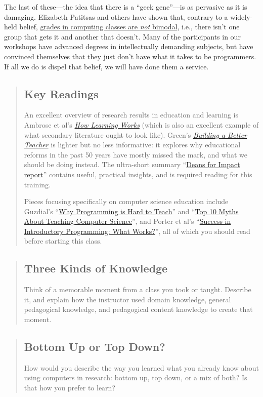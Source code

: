 The last of these---the idea that there is a ``geek gene''---is as pervasive as it is damaging.
Elizabeth Patitsas and others have shown that,
contrary to a widely-held belief,
\href{http://dl.acm.org/citation.cfm?id=2960312}{grades in computing classes are \emph{not} bimodal},
i.e.,
there isn't one group that gets it and another that doesn't.
Many of the participants in our workshops have advanced degrees in intellectually demanding subjects,
but have convinced themselves that they just don't have what it takes to be programmers.
If all we do is dispel that belief,
we will have done them a service.

\begin{quotation}   %
\subsection*{Key Readings}

An excellent overview of research results in education and learning is
Ambrose et al's \emph{\href{http://www.amazon.com/How-Learning-Works-Research-Based-Jossey-Bass/dp/0470484101/}{How Learning Works}}
(which is also an excellent example of what secondary literature ought to look like).
Green's \emph{\href{http://www.amazon.com/Building-Better-Teacher-Teaching-Everyone/dp/0393081591/}{Building a Better Teacher}}
is lighter but no less informative:
it explores why educational reforms in the past 50 years have mostly missed the mark,
and what we should be doing instead.
The ultra-short summary ``\href{\{\{ page.root \}\}/files/papers/science-of-learning-2015.pdf}{Deans for Impact report}''
contains useful, practical insights, and is required reading for this training.

Pieces focusing specifically on computer science education include
Guzdial's ``\href{\{\{ page.root \}\}/files/papers/guzdial-why-hard-to-teach-2011.pdf}{Why Programming is Hard to Teach}''
and ``\href{\{\{ page.root \}\}/files/papers/guzdial-10-myths-2015.pdf}{Top 10 Myths About Teaching Computer Science}'',
and Porter et al's ``\href{\{\{ page.root \}\}/files/papers/porter-what-works-2013.pdf}{Success in Introductory Programming: What Works?}'',
all of which you should read before starting this class.
\end{quotation}   %

\begin{quotation}   %
\subsection*{Three Kinds of Knowledge}

Think of a memorable moment from a class you took or taught.
Describe it,
and explain how the instructor used domain knowledge,
general pedagogical knowledge,
and pedagogical content knowledge to create that moment.
\end{quotation}   %

\begin{quotation}   %
\subsection*{Bottom Up or Top Down?}

How would you describe the way you learned what you already know
about using computers in research:
bottom up, top down, or a mix of both?
Is that how you prefer to learn?
\end{quotation}   %
